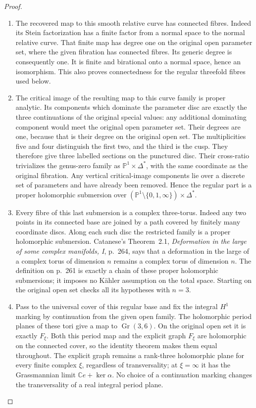 \documentclass[11pt,a4paper]{article}
\theoremstyle{definition}
\begin{document}
\begin{proof}
\begin{enumerate}[label=\arabic*.]
\item The recovered map to this smooth relative curve has connected
fibres. Indeed its Stein factorization has a finite factor
from a normal space to the normal relative curve. That finite
map has degree one on the original open parameter set, where
the given fibration has connected fibres. Its generic degree
is consequently one. It is finite and birational onto a normal
space, hence an isomorphism. This also proves connectedness
for the regular threefold fibres used below.

\item The critical image of the resulting map to this curve family
is proper analytic. Its components which dominate the
parameter disc are exactly the three continuations of the
original special values: any additional dominating component
would meet the original open parameter set. Their degrees
are one, because that is their degree on the original open
set. The multiplicities five and four distinguish the first
two, and the third is the cusp. They therefore give three
labelled sections on the punctured disc. Their cross-ratio
trivializes the genus-zero family as
$\mathbb P^1\times\Delta^*$, with the same coordinate as
the original fibration. Any vertical critical-image components
lie over a discrete set of parameters and have already been
removed. Hence the regular part is a proper holomorphic
submersion over
$(\mathbb P^1\setminus\{0,1,\infty\})\times\Delta^*$.

\item Every fibre of this last submersion is a complex three-torus.
Indeed any two points in its connected base are joined by
a path covered by finitely many coordinate discs. Along
each such disc the restricted family is a proper holomorphic
submersion. Catanese's Theorem~2.1, \emph{Deformation in the
large of some complex manifolds, I}, p.~264, says that a
deformation in the large of a complex torus of dimension
$n$ remains a complex torus of dimension $n$. The definition
on p.~261 is exactly a chain of these proper holomorphic
submersions; it imposes no Kähler assumption on the total
space. Starting on the original open set checks all its
hypotheses with $n=3$.

\item Pass to the universal cover of this regular base and fix the
integral $H^1$ marking by continuation from the given open
family. The holomorphic period planes of these tori give
a map to $\operatorname{Gr}(3,6)$. On the original open
set it is exactly $F_\xi$. Both this period map and the
explicit graph $F_\xi$ are holomorphic on the connected
cover, so the identity theorem makes them equal throughout.
The explicit graph remains a rank-three holomorphic plane
for every finite complex $\xi$, regardless of transversality;
at $\xi=\infty$ it has the Grassmannian limit
$\mathbb C e+\ker\alpha$. No choice of a continuation
marking changes the transversality of a real integral
period plane.


\end{enumerate}
\end{proof}
\end{document}

